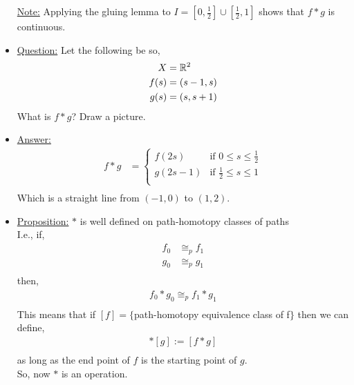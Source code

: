 \documentclass[../notes.tex]{subfiles}
\begin{document}
\begin{itemize}
\begin{theorem}
        \end{theorem}
            \underline{Note:} Applying the gluing lemma to $I = [0,\frac{1}{2}]\cup [\frac{1}{2}, 1]$ shows
            that $f*g$ is continuous.
        \item \underline{Question:} Let the following be so,
            \begin{align*}
                X &= \mathbb{R}^2\\
                f(s)&=(s-1,s)\\
                g(s)&=(s,s+1)\\
            \end{align*}
            What is $f*g$? Draw a picture.
        \item \underline{Answer:} 
            \begin{align*}
                f*g &= \begin{cases}
                    f(2s) & \text{if }0\leq s \le \frac{1}{2}\\
                    g(2s-1) & \text{if }\frac{1}{2}\leq s \le 1\\
                \end{cases}\\
            \end{align*}
            Which is a straight line from $(-1,0)$ to $(1,2)$.
        \item \underline{Proposition:} $*$ is well defined on path-homotopy classes of paths\\
            I.e., if,
            \begin{align*}
                f_0&\cong_{p}f_1\\
                g_0&\cong_{p}g_1\\
            \end{align*}
            then,
            \begin{align*}
                f_0*g_0\cong_{p}f_1*g_1\\
            \end{align*}
            This means that if $[f]=\{$path-homotopy equivalence class of f$\}$ then we can define,
            \begin{align*}
                [f]*[g]:=[f*g]\\
            \end{align*}
            as long as the end point of $f$ is the starting point of $g$.\\
            So, now $*$ is an operation.
            \begin{align*}

\end{align*}
\end{itemize}
\end{document}
